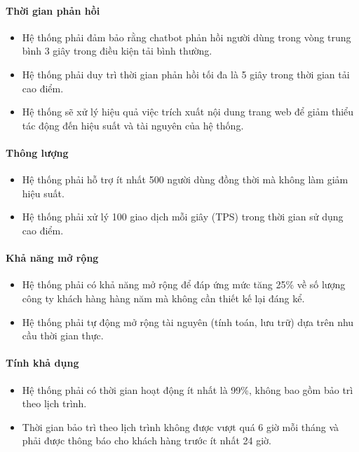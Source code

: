 \paragraph{Thời gian phản hồi}
\begin{itemize}
    \item Hệ thống phải đảm bảo rằng chatbot phản hồi người dùng trong vòng trung bình 3 giây trong điều kiện tải bình thường.
    \item Hệ thống phải duy trì thời gian phản hồi tối đa là 5 giây trong thời gian tải cao điểm.
    \item Hệ thống sẽ xử lý hiệu quả việc trích xuất nội dung trang web để giảm thiểu tác động đến hiệu suất và tài nguyên của hệ thống.
\end{itemize}

\paragraph{Thông lượng}
\begin{itemize}
    \item Hệ thống phải hỗ trợ ít nhất 500 người dùng đồng thời mà không làm giảm hiệu suất.
    \item Hệ thống phải xử lý 100 giao dịch mỗi giây (TPS) trong thời gian sử dụng cao điểm.
\end{itemize}

\paragraph{Khả năng mở rộng}
\begin{itemize}
    \item Hệ thống phải có khả năng mở rộng để đáp ứng mức tăng 25\% về số lượng công ty khách hàng hàng năm mà không cần thiết kế lại đáng kể.
    \item Hệ thống phải tự động mở rộng tài nguyên (tính toán, lưu trữ) dựa trên nhu cầu thời gian thực.
\end{itemize}

\paragraph{Tính khả dụng}
\begin{itemize}
    \item Hệ thống phải có thời gian hoạt động ít nhất là 99\%, không bao gồm bảo trì theo lịch trình.
    \item Thời gian bảo trì theo lịch trình không được vượt quá 6 giờ mỗi tháng và phải được thông báo cho khách hàng trước ít nhất 24 giờ.
\end{itemize}

